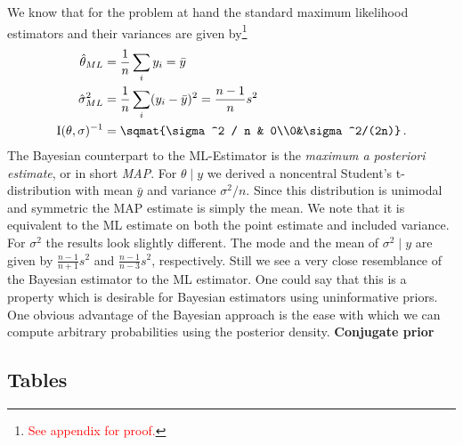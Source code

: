 We know that for the problem at hand the standard maximum likelihood estimators
and their variances are given by\footnote{\textcolor{red}{See appendix for proof.}}
\begin{align}
  \hat{\theta}_{ML} &= \frac{1}{n} \sum_i y_i = \bar{y}\,\\
  \hat{\sigma}_{ML}^2 &= \frac{1}{n} \sum_i (y_i - \bar{y})^2 = \frac{n-1}{n} s^2\,\\
  \mathrm{I}(\theta, \sigma)^{-1} &= \sqmat{\sigma^2 / n & 0\\0&\sigma^2/(2n)} \,.
\end{align}
The Bayesian counterpart to the ML-Estimator is the \emph{maximum a posteriori estimate},
or in short \emph{MAP}. For $\theta \mid y$ we derived a noncentral Student's t-distribution
with mean $\bar{y}$ and variance $\sigma^2/n$. Since this distribution is unimodal and
symmetric the MAP estimate is simply the mean. We note that it is equivalent to
the ML estimate on both the point estimate and included variance. For $\sigma^2$
the results look slightly different. The mode and the mean of $\sigma^2 \mid y$
are given by $\frac{n-1}{n+1} s^2$ and $\frac{n-1}{n-3} s^2$, respectively.
Still we see a very close resemblance of the Bayesian estimator to the ML estimator.
One could say that this is a property which is desirable for Bayesian estimators
using uninformative priors. One obvious advantage of the Bayesian approach is the
ease with which we can compute arbitrary probabilities using the posterior density.
\textbf{Conjugate prior}

\subsection{Tables}
